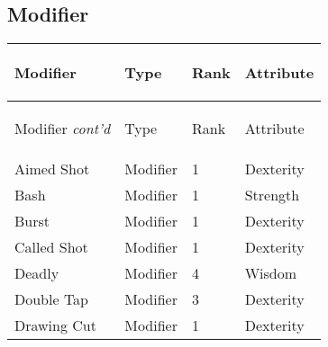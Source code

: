 \documentclass[twoside]{book}
\begin{document}
    

\subsection{Modifier}
    
\begin{longtable}{p{1.25in}lll} 
  Modifier
  &
  \begin{turn}{70}{Type}\end{turn}
          
  &
  \begin{turn}{70}{Rank}\end{turn}
          
  &
  \begin{turn}{70}{Attribute}\end{turn}
          
  \\
  \hline
  \hline
  \endfirsthead
  Modifier \textit{cont'd}
        
  &
  \begin{turn}{70}{Type}\end{turn}
          
  &
  \begin{turn}{70}{Rank}\end{turn}
          
  &
  \begin{turn}{70}{Attribute}\end{turn}
          
  \\
  \endhead
      
  \raggedright
           Aimed Shot 
  &
   Modifier 
  &
   1 
  &
   Dexterity 
  \tabularnewline
  \hline
      
  \raggedright
           Bash 
  &
   Modifier 
  &
   1 
  &
   Strength 
  \tabularnewline
  \hline
      
  \raggedright
           Burst 
  &
   Modifier 
  &
   1 
  &
   Dexterity 
  \tabularnewline
  \hline
      
  \raggedright
           Called Shot 
  &
   Modifier 
  &
   1 
  &
   Dexterity 
  \tabularnewline
  \hline
      
  \raggedright
           Deadly 
  &
   Modifier 
  &
   4 
  &
   Wisdom 
  \tabularnewline
  \hline
      
  \raggedright
           Double Tap 
  &
   Modifier 
  &
   3 
  &
   Dexterity 
  \tabularnewline
  \hline
      
  \raggedright
           Drawing Cut 
  &
   Modifier 
  &
   1 
  &
   Dexterity 
  \tabularnewline
  \hline
      

\end{longtable}
\end{document}
